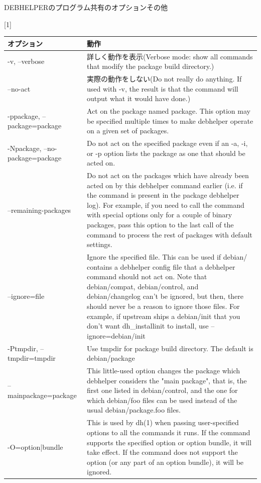 \documentclass[mingoth,a4paper]{jsarticle}
\begin{document}
DEBHELPERのプログラム共有のオプションその他
{\small
\begin{table}[htb]
\scalebox{1}[1]{
\begin{tabular}{|l|p{30em}|} \hline
オプション & 動作 \\ \hline
-v, --verbose & 詳しく動作を表示(Verbose mode: show all commands that modify the package build directory.) \\ \hline
--no-act & 実際の動作をしない(Do not really do anything. If used with -v, the result is that the command will output what it would have done.) \\ \hline
-ppackage, --package=package & Act on the package named package. This option may be specified multiple times to make debhelper operate on a given set of packages. \\ \hline
-Npackage, --no-package=package & Do not act on the specified package even if an -a, -i, or -p option lists the package as one that should be acted on.  \\ \hline
--remaining-packages & Do not act on the packages which have already been acted on by this debhelper command earlier (i.e. if the command is present in the package debhelper log).  For
           example, if you need to call the command with special options only for a couple of binary packages, pass this option to the last call of the command to process
           the rest of packages with default settings. \\ \hline
--ignore=file & Ignore the specified file. This can be used if debian/ contains a debhelper config file that a debhelper command should not act on. Note that debian/compat,
           debian/control, and debian/changelog can't be ignored, but then, there should never be a reason to ignore those files.
           For example, if upstream ships a debian/init that you don't want dh\_installinit to install, use --ignore=debian/init  \\ \hline
-Ptmpdir, --tmpdir=tmpdir & Use tmpdir for package build directory. The default is debian/package \\ \hline
--mainpackage=package & This little-used option changes the package which debhelper considers the "main package", that is, the first one listed in debian/control, and the one for which
           debian/foo files can be used instead of the usual debian/package.foo files. \\ \hline
-O=option|bundle & This is used by dh(1) when passing user-specified options to all the commands it runs. If the command supports the specified option or option bundle, it will
           take effect. If the command does not support the option (or any part of an option bundle), it will be ignored.\\ \hline
\end{tabular}
}
\end{table}
}
\end{document}
